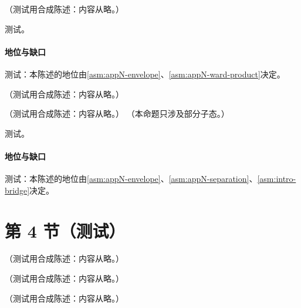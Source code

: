 \begin{proposition}\label{prop:ir-super-leading}
（测试用合成陈述：内容从略。）
\end{proposition}
\begin{proofsketch}测试。\end{proofsketch}
\paragraph{地位与缺口}测试：本陈述的地位由\cref{asm:appN-envelope}、\cref{asm:appN-ward-product}决定。

\begin{remark}[标度陈述与积分界]\label{rem:ir-scaling-vs-bound}
（测试用合成陈述：内容从略。）
\end{remark}

\begin{theorem}\label{thm:ir-leading-regions}
（测试用合成陈述：内容从略。）
（本命题只涉及部分子态。）
\end{theorem}
\begin{proofsketch}测试。\end{proofsketch}
\paragraph{地位与缺口}测试：本陈述的地位由\cref{asm:appN-envelope}、\cref{asm:appN-separation}、\cref{asm:intro-bridge}决定。

\section{第 4 节（测试）}\label{sec:ir-power}

\begin{example}[单圈无质量顶点]\label{ex:ir-vertex}
（测试用合成陈述：内容从略。）
\end{example}

\begin{example}\label{ex:ir-k-dominance}
（测试用合成陈述：内容从略。）
\end{example}

\begin{example}\label{ex:ir-real-emission}
（测试用合成陈述：内容从略。）
\end{example}

